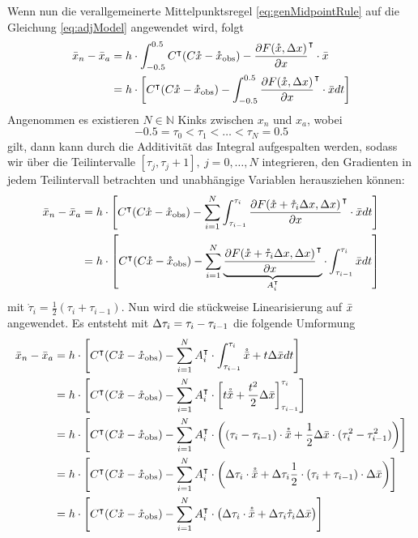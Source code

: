 Wenn nun die verallgemeinerte Mittelpunktsregel \eqref{eq:genMidpointRule} auf die Gleichung \eqref{eq:adjModel} angewendet wird, folgt
\begin{align*}
\bar{x}_n - \bar{x}_a &= h\cdot \int_{-0.5}^{0.5}C^\intercal(C\mathring{x}-\mathring{x}_{\text{obs}}) - \frac{\partial F(\mathring{x},\Delta x)}{\partial x}^\intercal \cdot \bar{x}\\
									&= h\cdot \left[C^\intercal(C\mathring{x}-\mathring{x}_{\text{obs}}) - \int_{-0.5}^{0.5} \frac{\partial F(\mathring{x} ,\Delta x)}{\partial x}^\intercal \cdot \bar{x} dt\right]\\
\end{align*}
Angenommen es existieren $N \in \mathbb{N}$ Kinks zwischen $x_n$ und $x_{a}$, wobei \[-0.5 = \tau_0 <\tau_1 <\ldots < \tau_N=0.5\] gilt, dann kann durch die Additivität das Integral aufgespalten werden, sodass wir über die Teilintervalle $[\tau_j,\tau_j+1],~ j=0,\ldots,N$ integrieren, den Gradienten in jedem Teilintervall betrachten und unabhängige Variablen herausziehen können:
\begin{align*}
\bar{x}_n - \bar{x}_a &= h\cdot \left[ C^\intercal(C\mathring{x}-\mathring{x}_{\text{obs}}) - \sum_{i=1}^N \int_{\tau_{i-1}}^{\tau_{i}}\frac{\partial F(\mathring{x}+\mathring \tau_i\Delta x,\Delta x)}{\partial x}^\intercal \cdot \bar{x} dt\right]\\
									&= h\cdot \left[C^\intercal(C\mathring{x} -\mathring{x}_{\text{obs}}) - \sum_{i=1}^N \underbrace{\frac{\partial F(\mathring{x}+\mathring \tau_i\Delta x,\Delta x)}{\partial x}^\intercal }_{A_i^\intercal} \cdot \int_{\tau_{i-1}}^{\tau_{i}} \bar{x} dt\right]\\
\end{align*}
mit $\mathring \tau_i=\frac{1}{2}(\tau_i+\tau_{i-1})$.
Nun wird die stückweise Linearisierung auf $\bar{x}$ angewendet. Es entsteht mit $\Delta \tau_i=\tau_i-\tau_{i-1}$ die folgende Umformung
\allowdisplaybreaks
\begin{align*}
\bar{x}_n - \bar{x}_a &= h\cdot \left[C^\intercal(C\mathring{x} -\mathring{x}_{\text{obs}}) - \sum_{i=1}^N A_i^\intercal \cdot \int_{\tau_{i-1}}^{\tau_{i}} \mathring{\bar{x}} + t\Delta \bar{x} dt\right]\\
		  &= h\cdot \left[C^\intercal(C\mathring{x} -\mathring{x}_{\text{obs}}) - \sum_{i=1}^N A_i^\intercal \cdot \left[t\mathring{\bar{x}} + \frac{t^2}{2}\Delta \bar{x} \right]_{\tau_{i-1}}^{\tau_i} \right]\\
		  &= h\cdot \left[C^\intercal(C\mathring{x} -\mathring{x}_{\text{obs}}) - \sum_{i=1}^N A_i^\intercal \cdot \left( (\tau_i - \tau_{i-1})\cdot \mathring{\bar{x}} + \frac{1}{2}\Delta \bar{x} \cdot(\tau_i^2-\tau_{i-1}^2) \right)\right]\\
		  &= h\cdot \left[C^\intercal(C\mathring{x} -\mathring{x}_{\text{obs}}) - \sum_{i=1}^N A_i^\intercal \cdot \left(\Delta \tau_i\cdot \mathring{\bar{x}} +  \Delta \tau_i \frac{1}{2}\cdot(\tau_i+\tau_{i-1})\cdot \Delta \bar{x} \right)\right]\\
		  &= h\cdot \left[C^\intercal(C\mathring{x} -\mathring{x}_{\text{obs}}) - \sum_{i=1}^N A_i^\intercal \cdot \left( \Delta \tau_i\cdot \mathring{\bar{x}} +  \Delta \tau_i \mathring{\tau}_i \Delta \bar{x} \right)\right]
\end{align*}

